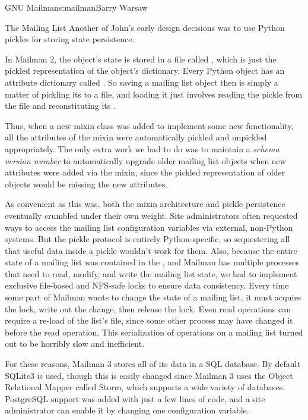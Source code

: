 \begin{aosachapter}{GNU Mailman}{s:mailman}{Barry Warsaw}
\begin{aosasect1}{The Mailing List}
Another of John's early
design decisions was to use Python pickles for storing 
state persistence.

In Mailman 2, the  object's state is stored in a file
called , which is just the pickled representation of
the  object's dictionary.  Every Python object has an
attribute dictionary called .  So saving a mailing
list object then is simply a matter of pickling its
 to a file, and loading it just involves reading
the pickle from the file and reconstituting its .

Thus, when a new mixin class was added to implement some new
functionality, all the attributes of the mixin were automatically
pickled and unpickled appropriately.  The only extra work we had to do
was to maintain a \emph{schema version number} to automatically
upgrade older mailing list objects when new attributes were added via
the mixin, since the pickled representation of older 
objects would be missing the new attributes.

As convenient as this was, both the mixin architecture and pickle
persistence eventually crumbled under their own weight.  Site
administrators often requested ways to access the mailing list
configuration variables via external, non-Python systems.  But the
pickle protocol is entirely Python-specific, so sequestering all that
useful data inside a pickle wouldn't work for them.  Also, because the
entire state of a mailing list was contained in the ,
and Mailman has multiple processes that need to read, modify, and
write the mailing list state, we had to implement exclusive file-based
and NFS-safe locks to ensure data consistency.  Every time some part
of Mailman wants to change the state of a mailing list, it must
acquire the lock, write out the change, then release the lock.  Even
read operations can require a re-load of the list's 
file, since some other process may have changed it before the read
operation.  This serialization of operations on a mailing list turned
out to be horribly slow and inefficient.

For these reasons, Mailman 3 stores all of its data in a SQL database.
By default SQLite3 is used, though this is easily changed since
Mailman 3 uses the Object Relational Mapper called Storm, which
supports a wide variety of databases.  PostgreSQL support was added
with just a few lines of code, and a site administrator can enable it
by changing one configuration variable.


\end{aosasect1}
\end{aosachapter}
